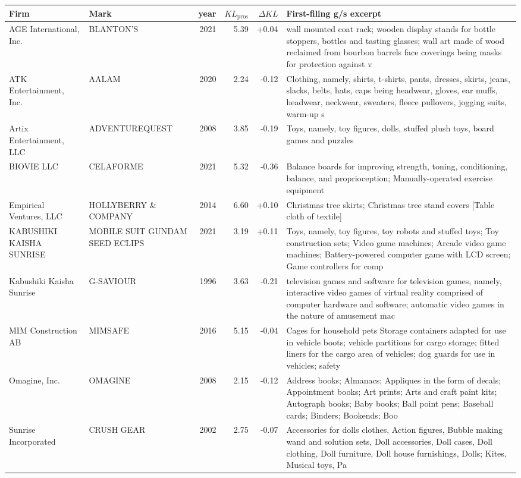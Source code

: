 \begin{tabular}{p{4.0cm}p{2.2cm}rrrp{6.5cm}}
\toprule
Firm & Mark & year & $KL_\text{pros}$ & $\Delta KL$ & First-filing g/s excerpt \\
\midrule
AGE International, Inc. & BLANTON'S & 2021 & 5.39 & +0.04 & wall mounted coat rack; wooden display stands for bottle stoppers, bottles and tasting glasses; wall art made of wood reclaimed from bourbon barrels face coverings being masks for protection against v \\
ATK Entertainment, Inc. & AALAM & 2020 & 2.24 & -0.12 & Clothing, namely, shirts, t-shirts, pants, dresses, skirts, jeans, slacks, belts, hats, caps being headwear, gloves, ear muffs, headwear, neckwear, sweaters, fleece pullovers, jogging suits, warm-up s \\
Artix Entertainment, LLC & ADVENTUREQUEST & 2008 & 3.85 & -0.19 & Toys, namely, toy figures, dolls, stuffed plush toys, board games and puzzles \\
BIOVIE LLC & CELAFORME & 2021 & 5.32 & -0.36 & Balance boards for improving strength, toning, conditioning, balance, and proprioception; Manually-operated exercise equipment \\
Empirical Ventures, LLC & HOLLYBERRY \& COMPANY & 2014 & 6.60 & +0.10 & Christmas tree skirts; Christmas tree stand covers [Table cloth of textile] \\
KABUSHIKI KAISHA SUNRISE & MOBILE SUIT GUNDAM SEED ECLIPS & 2021 & 3.19 & +0.11 & Toys, namely, toy figures, toy robots and stuffed toys; Toy construction sets; Video game machines; Arcade video game machines; Battery-powered computer game with LCD screen; Game controllers for comp \\
Kabushiki Kaisha Sunrise & G-SAVIOUR & 1996 & 3.63 & -0.21 & television games and software for television games, namely, interactive video games of virtual reality comprised of computer hardware and software; automatic video games in the nature of amusement mac \\
MIM Construction AB & MIMSAFE & 2016 & 5.15 & -0.04 & Cages for household pets Storage containers adapted for use in vehicle boots; vehicle partitions for cargo storage; fitted liners for the cargo area of vehicles; dog guards for use in vehicles; safety \\
Omagine, Inc. & OMAGINE & 2008 & 2.15 & -0.12 & Address books; Almanacs; Appliques in the form of decals; Appointment books; Art prints; Arts and craft paint kits; Autograph books; Baby books; Ball point pens; Baseball cards; Binders; Bookends; Boo \\
Sunrise Incorporated & CRUSH GEAR & 2002 & 2.75 & -0.07 & Accessories for dolls clothes, Action figures, Bubble making wand and solution sets, Doll accessories, Doll cases, Doll clothing, Doll furniture, Doll house furnishings, Dolls; Kites, Musical toys, Pa \\
\bottomrule
\end{tabular}
\clearpage

